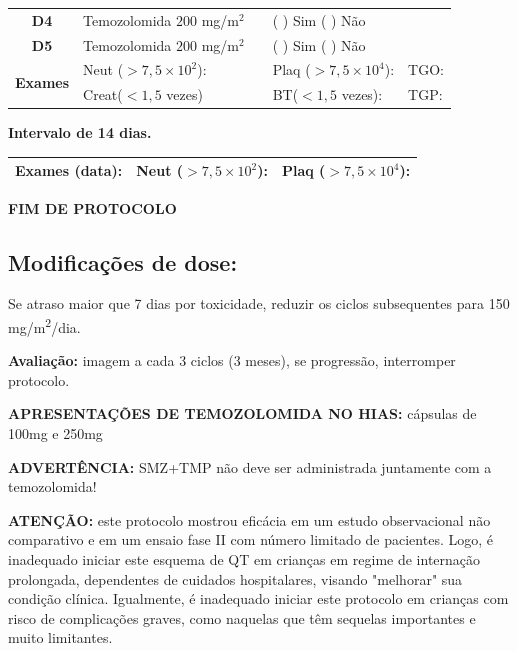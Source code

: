 \documentclass[11pt,a4paper,oldfontcommands]{memoir}
\begin{document}
\begin{center}
\begin{table}[H]
\begin{tabular}{p{1cm}p{5cm}|p{1cm}|p{4.5cm}|p{2cm}}
    \multicolumn{1}{c|}{\multirow{1}{*}{\textbf{D4}}}&{Temozolomida \(200\) mg/m\(^2\)}&&{(  ) Sim (  ) Não}&\\
    \multicolumn{1}{c|}{\multirow{1}{*}{\textbf{D5}}}&{Temozolomida \(200\) mg/m\(^2\)}&&{(  ) Sim (  ) Não}&\\
    \hline
    \multicolumn{1}{c|}{\multirow{2}{*}{\textbf{Exames}}}&\multicolumn{2}{l|}{Neut (\(>7,5\times10^2\)):}&{Plaq (\(>7,5\times10^4\)):}&{TGO:}\\
    \cline{2-5}
    \multicolumn{1}{c|}{\multirow{2}{*}{{}}}&\multicolumn{2}{l|}{Creat(\(<1,5\) vezes)}&{BT(\(<1,5\) vezes):}&{TGP:}
    \\
    \hline
\end{tabular}
\end{table}
\textbf{Intervalo de 14 dias.}
\begin{table}[H]
\begin{tabular}{p{5cm}|p{5cm}|p{4.7cm}}
    \hline
    \textbf{Exames (data):}&{Neut (\(>7,5\times10^2\)):}&{Plaq (\(>7,5\times10^4\)):}
    \\
    \hline
\end{tabular}
\end{table}

\textbf{FIM DE PROTOCOLO}

\end{center}
\subsection{Modificações de dose:}
Se atraso maior que 7 dias por toxicidade, reduzir os ciclos subsequentes para 150 mg/m\textsuperscript{2}/dia.

\textbf{Avaliação:} imagem a cada 3 ciclos (3 meses), se progressão, interromper protocolo.

\textbf{APRESENTAÇÕES DE TEMOZOLOMIDA NO HIAS:} cápsulas de 100mg e 250mg

\textbf{ADVERTÊNCIA:} SMZ+TMP não deve ser administrada juntamente com a temozolomida!

\textbf{ATENÇÃO:} este protocolo mostrou eficácia em um estudo observacional não comparativo e em um ensaio fase II com número limitado de pacientes. Logo, é inadequado iniciar este esquema de QT em crianças em regime de internação prolongada, dependentes de cuidados hospitalares, visando "melhorar" sua condição clínica. Igualmente, é inadequado iniciar este protocolo em crianças com risco de complicações graves, como naquelas que têm sequelas importantes e muito limitantes.
\end{document}

